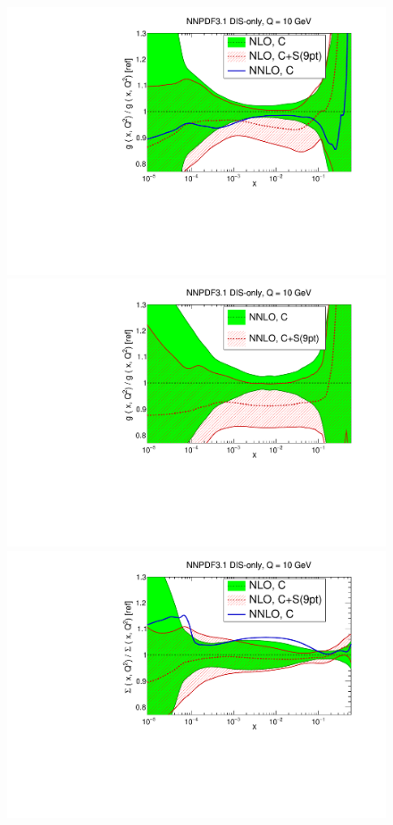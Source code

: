 \begin{figure}[t]
  \begin{center}
    \includegraphics[scale=0.39]{mhous/plots/xg-DISonly-NLO-CovMatTH-EXP-vsTH.pdf}
     \includegraphics[scale=0.39]{mhous/plots/xg-DISonly-NNLO-CovMatTH-EXP-vsTH.pdf}
   \includegraphics[scale=0.39]{mhous/plots/xsinglet-DISonly-NLO-CovMatTH-EXP-vsTH.pdf}

\end{center}
\end{figure}
